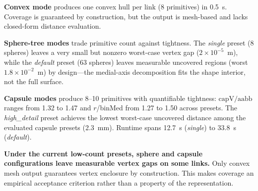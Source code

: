 \begin{table}[t]
\centering
\caption{Aggregate mode comparison on the Franka FR3 arm (8 links: link0--link7). Worst-case metrics report the maximum (worst) value across all arm links.}
\label{tab:mode_comparison}
\end{table}

\textbf{Convex mode} produces one convex hull per link (8 primitives) in 0.5~s. Coverage is guaranteed by construction, but the output is mesh-based and lacks closed-form distance evaluation.

\textbf{Sphere-tree modes} trade primitive count against tightness. The \emph{single} preset (8 spheres) leaves a very small but nonzero worst-case vertex gap ($2\times 10^{-5}$~m), while the \emph{default} preset (63 spheres) leaves measurable uncovered regions (worst $1.8\times 10^{-2}$~m) by design---the medial-axis decomposition fits the shape interior, not the full surface.

\textbf{Capsule modes} produce 8--10 primitives with quantifiable tightness: $\mathrm{capV/aabb}$ ranges from 1.32 to 1.47 and $r$/binMed from 1.27 to 1.50 across presets. The \emph{high\_detail} preset achieves the lowest worst-case uncovered distance among the evaluated capsule presets (2.3~mm). Runtime spans 12.7~s (\emph{single}) to 33.8~s (\emph{default}).

\textbf{Under the current low-count presets, sphere and capsule configurations leave measurable vertex gaps on some links.} Only convex mesh output guarantees vertex enclosure by construction. This makes coverage an empirical acceptance criterion rather than a property of the representation.


